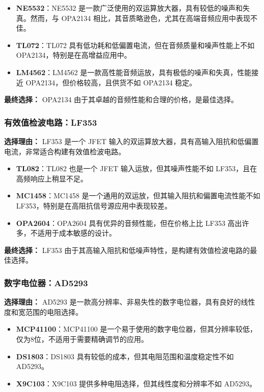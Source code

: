 \documentclass[lang=cn,11pt,a4paper]{elegantpaper}
\begin{document}
\begin{itemize}
  \item \textbf{NE5532}：NE5532 是一款广泛使用的双运算放大器，具有较低的噪声和失真。然而，与 OPA2134 相比，其音质略逊色，尤其在高端音频应用中表现不佳。
  \item \textbf{TL072}：TL072 具有低功耗和低偏置电流，但在音频质量和噪声性能上不如 OPA2134，特别是在高增益应用中。
  \item \textbf{LM4562}：LM4562 是一款高性能音频运放，具有极低的噪声和失真，性能接近 OPA2134，但价格较高，且供货不如 OPA2134 稳定。
\end{itemize}

\textbf{最终选择：} OPA2134 由于其卓越的音频性能和合理的价格，是最佳选择。

\subsubsection{有效值检波电路：LF353}
\textbf{选择理由：} LF353 是一个 JFET 输入的双运算放大器，具有高输入阻抗和低偏置电流，非常适合构建有效值检波电路。

\begin{itemize}
  \item \textbf{TL082}：TL082 也是一个 JFET 输入运放，但其噪声性能不如 LF353，且在高频响应上稍显不足。
  \item \textbf{MC1458}：MC1458 是一个通用的双运放，但其输入阻抗和偏置电流性能不如 LF353，特别是在高阻抗信号源应用中表现较差。
  \item \textbf{OPA2604}：OPA2604 具有优异的音频性能，但在价格上比 LF353 高出许多，不适用于成本敏感的设计。
\end{itemize}

\textbf{最终选择：} LF353 由于其高输入阻抗和低噪声特性，是构建有效值检波电路的最佳选择。

\subsubsection{数字电位器：AD5293}
\textbf{选择理由：} AD5293 是一款高分辨率、非易失性的数字电位器，具有良好的线性度和宽范围的电阻选择。

\begin{itemize}
  \item \textbf{MCP41100}：MCP41100 是一个易于使用的数字电位器，但其分辨率较低，仅为8位，不适用于需要精确调节的应用。
  \item \textbf{DS1803}：DS1803 具有较低的成本，但其电阻范围和温度稳定性不如 AD5293。
  \item \textbf{X9C103}：X9C103 提供多种电阻选择，但其线性度和分辨率不如 AD5293。
\end{itemize}
\end{document}
